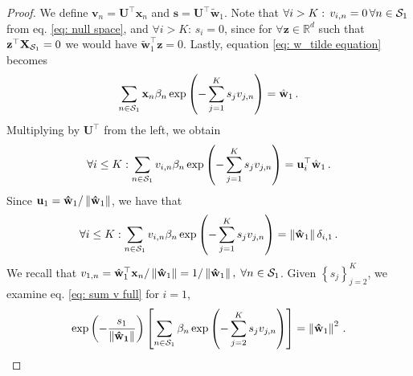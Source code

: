 \documentclass[twoside,11pt,english]{article}
\begin{document}
\begin{proof}
We define $\mathbf{v}_{n}=\mathbf{U}^{\top}\mathbf{x}_{n}$ and $\mathbf{s}=\mathbf{U}^{\top}\tilde{\mathbf{w}}_{1}$.
Note that $\forall i>K:\,v_{i,n}=0\,\forall n\in\mathcal{S}_{1}$ from eq.
\ref{eq: null space}, and $\forall i>K:\,s_{i}=0$, since for $\forall\mathbf{z}\in\mathbb{R}^{d}$
such that $\mathbf{z}^{\top}\mathbf{X}_{\mathcal{S}_{1}}=0$ we would have
$\tilde{\mathbf{w}}_{1}^{\top}\mathbf{z}=0$. Lastly, equation \ref{eq: w_tilde equation}
becomes 
\begin{equation}
\sum_{n\in\mathcal{S}_{1}}\mathbf{x}_{n}\beta_{n}\exp\left(-\sum_{j=1}^{K}s_{j}v_{j,n}\right)=\hat{\mathbf{w}}_{1}\,.\label{eq: s equation}
\end{equation}
Multiplying by $\mathbf{U}^{\top}$ from the left, we obtain 
\[
\forall i\leq K:\sum_{n\in\mathcal{S}_{1}}v_{i,n}\beta_{n}\exp\left(-\sum_{j=1}^{K}s_{j}v_{j,n}\right)=\mathbf{u}_{i}^{\top}\hat{\mathbf{w}}_{1}\,.
\]
Since $\mathbf{u}_{1}=\mathbf{\hat{\mathbf{w}}}_{1}/\left\Vert \mathbf{\hat{\mathbf{w}}}_{1}\right\Vert $,
we have that 
\begin{equation}
\forall i\leq K:\sum_{n\in\mathcal{S}_{1}}v_{i,n}\beta_{n}\exp\left(-\sum_{j=1}^{K}s_{j}v_{j,n}\right)=\left\Vert \mathbf{\hat{\mathbf{w}}}_{1}\right\Vert \delta_{i,1}\,.\label{eq: sum v full}
\end{equation}
We recall that $v_{1,n}=\hat{\mathbf{w}}_{1}^{\top}\mathbf{x}_{n}/\left\Vert \mathbf{\hat{\mathbf{w}}}_{1}\right\Vert =1/\left\Vert \mathbf{\hat{\mathbf{w}}}_{1}\right\Vert ,$
$\forall n\in\mathcal{S}_{1}$. Given $\left\{ s_{j}\right\} _{j=2}^{K}$,
we examine eq. \ref{eq: sum v full} for $i=1$, 
\[
\exp\left(-\frac{s_{1}}{\left\Vert \mathbf{\hat{\mathbf{w}}_1}\right\Vert }\right)\left[\sum_{n\in\mathcal{S}_{1}}\beta_{n}\exp\left(-\sum_{j=2}^{K}s_{j}v_{j,n}\right)\right]=\left\Vert \mathbf{\hat{\mathbf{w}}}_{1}\right\Vert ^{2}\,.
\]


\end{proof}
\end{document}
